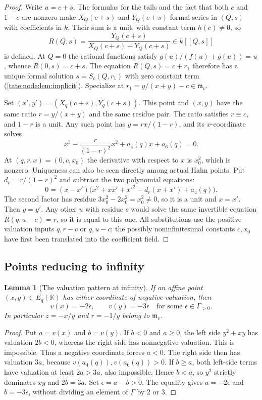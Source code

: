 \documentclass[11pt,letterpaper]{article}
\newtheorem{lemma}[lemma]{Lemma}
\theoremstyle{definition}
\newcommand{\m}{\mathfrak m}
\newcommand{\KK}{\mathbb K}
\begin{document}
\begin{proof}
Write $u=c+s$. The formulas for the tails and the fact that both $c$ and
$1-c$ are nonzero make $X_Q(c+s)$ and $Y_Q(c+s)$ formal series in $(Q,s)$
with coefficients in $k$. Their sum is a unit, with constant term
$h(c)\ne0$, so
\[
 R(Q,s)=\frac{Y_Q(c+s)}{X_Q(c+s)+Y_Q(c+s)}\in k[[Q,s]]
\]
is defined. At $Q=0$ the rational functions satisfy $g(u)/(f(u)+g(u))=u$,
whence $R(0,s)=c+s$. The equation $R(Q,s)=c+r_1$ therefore has a unique
formal solution $s=S_c(Q,r_1)$ with zero constant term
(\cref{tate:node:lem:implicit}). Specialize at $r_1=y/(x+y)-c\in\m_v$.

Set $(x',y')=(X_q(c+s),Y_q(c+s))$. This point and $(x,y)$ have the same
ratio $r=y/(x+y)$ and the same residue pair. The ratio satisfies $r\equiv c$,
and $1-r$ is a unit. Any such point has $y=rx/(1-r)$, and its
$x$-coordinate solves
\begin{equation}
 x^3-\frac{r}{(1-r)^2}x^2+a_4(q)x+a_6(q)=0.\label{tate:node:eq:smoothpolynomial}
\end{equation}
At $(q,r,x)=(0,c,x_0)$ the derivative with respect to $x$ is $x_0^2$, which
is nonzero. Uniqueness can also be seen directly among actual Hahn
points. Put $d_r=r/(1-r)^2$ and subtract the two polynomial equations:
\[
 0=(x-x')\bigl(x^2+xx'+x'^2-d_r(x+x')+a_4(q)\bigr).
\]
The second factor has residue $3x_0^2-2x_0^2=x_0^2\ne0$, so it is a
unit and $x=x'$. Then $y=y'$. Any other $u$ with residue $c$ would solve
the same invertible equation $R(q,u-c)=r$, so it is equal to this one.
All substitutions use the positive-valuation inputs $q,r-c$ or $q,u-c$;
the possibly noninfinitesimal constants $c,x_0$ have first been translated
into the coefficient field.
\end{proof}

\subsection{Points reducing to infinity}

\begin{lemma}[The valuation pattern at infinity]\label{tate:node:lem:infinityvalues}
If an affine point $(x,y)\in E_q(\KK)$ has either coordinate of negative
valuation, then
\[
 v(x)=-2\epsilon,\qquad v(y)=-3\epsilon
 \quad\text{for some }\epsilon\in\Gamma_{>0}.
\]
In particular $z=-x/y$ and $r=-1/y$ belong to $\m_v$.
\end{lemma}

\begin{proof}
Put $a=v(x)$ and $b=v(y)$. If $b<0$ and $a\ge0$, the left side $y^2+xy$
has valuation $2b<0$, whereas the right side has nonnegative valuation.
This is impossible. Thus a negative coordinate forces $a<0$. The right side
then has valuation $3a$, because $v(a_4(q)),v(a_6(q))>0$. If $b\ge a$, both
left-side terms have valuation at least $2a>3a$, also impossible. Hence
$b<a$, so $y^2$ strictly dominates $xy$ and $2b=3a$. Set $\epsilon=a-b>0$.
The equality gives $a=-2\epsilon$ and $b=-3\epsilon$, without dividing an
element of $\Gamma$ by $2$ or $3$.
\end{proof}
\end{document}
